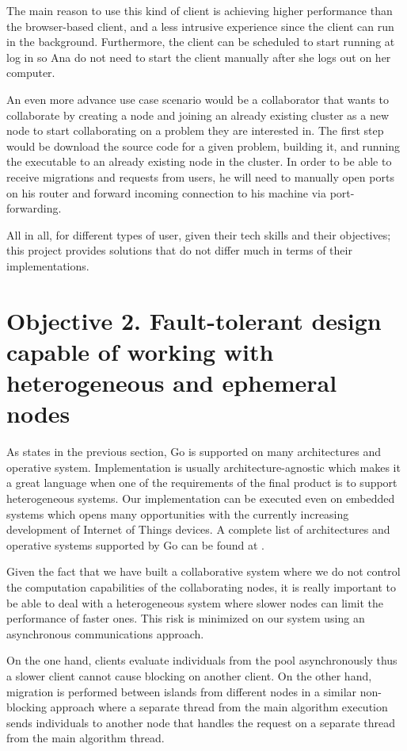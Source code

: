 The main reason to use this kind of client is achieving higher performance than the browser-based client, and a less intrusive experience since the client can run in the background. Furthermore, the client can be scheduled to start running at log in so Ana do not need to start the client manually after she logs out on her computer.

An even more advance use case scenario would be a collaborator that wants to collaborate by creating a node and joining an already existing cluster as a new node to start collaborating on a problem they are interested in. The first step would be download the source code for a given problem, building it, and running the executable to an already existing node in the cluster. In order to be able to receive migrations and requests from users, he will need to manually open ports on his router and forward incoming connection to his machine via port-forwarding.

All in all, for different types of user, given their tech skills and their objectives; this project provides solutions that do not differ much in terms of their implementations.

\section{Objective 2. Fault-tolerant design capable of working with heterogeneous and ephemeral nodes}

As states in the previous section, Go is supported on many architectures and operative system. Implementation is usually architecture-agnostic which makes it a great language when one of the requirements of the final product is to support heterogeneous systems. Our implementation can be executed even on embedded systems which opens many opportunities with the currently increasing development of Internet of Things devices. A complete list of architectures and operative systems supported by Go can be found at \cite{go-architectures}.

Given the fact that we have built a collaborative system where we do not control the computation capabilities of the collaborating nodes, it is really important to be able to deal with a heterogeneous system where slower nodes can limit the performance of faster ones. This risk is minimized on our system using an asynchronous communications approach. 

On the one hand, clients evaluate individuals from the pool asynchronously thus a slower client cannot cause blocking on another client. On the other hand, migration is performed between islands from different nodes in a similar non-blocking approach where a separate thread from the main algorithm execution sends individuals to another node that handles the request on a separate thread from the main algorithm thread.

